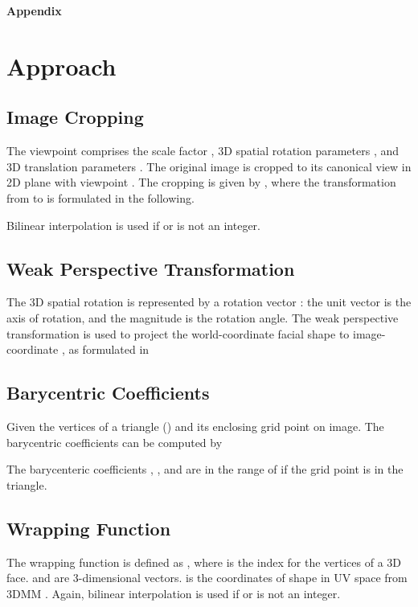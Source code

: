 
\onecolumn
\begin{appendix}
\begin{center}

{\LARGE \textbf{Appendix}}
\vspace{2mm}

\end{center}

\section{Approach}
\subsection{Image Cropping}
\label{cropping}
The viewpoint  comprises the scale factor , 3D spatial rotation parameters , and 3D translation parameters . The original image  is cropped to its canonical view in 2D plane with viewpoint . The cropping is given by , where the transformation from  to  is formulated in the following.

Bilinear interpolation is used if  or  is not an integer.

\subsection{Weak Perspective Transformation}
\label{tsfm}
The 3D spatial rotation is represented by a rotation vector : the unit vector  is the axis of rotation, and the magnitude  is the rotation angle. The weak perspective transformation is used to project the world-coordinate facial shape  to image-coordinate , as formulated in


\subsection{Barycentric Coefficients}
\label{barycentric}
Given the vertices of a triangle () and its enclosing grid point  on image. The barycentric coefficients can be computed by

The barycenteric coefficients , , and  are in the range of  if the grid point  is in the triangle.

\subsection{Wrapping Function}
\label{wrapping}
The wrapping function  is defined as , where  is the index for the vertices of a 3D face.  and  are 3-dimensional vectors.  is the coordinates of shape in UV space from 3DMM \cite{blanz1999morphable}. Again, bilinear interpolation is used if  or  is not an integer.




\end{appendix}
